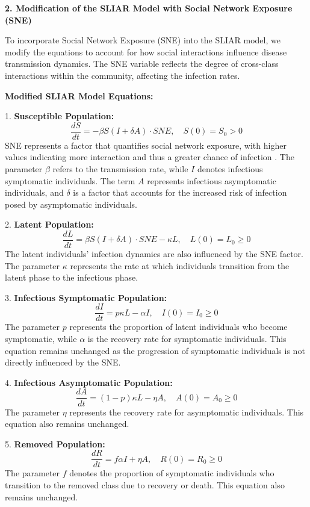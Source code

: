 \documentclass[9 pt]{article} %
\begin{document}
\textbf{2. Modification of the SLIAR Model with Social Network Exposure (SNE)}

To incorporate Social Network Exposure (SNE) into the SLIAR model, we modify the equations to account for how social interactions influence disease transmission dynamics. The SNE variable reflects the degree of cross-class interactions within the community, affecting the infection rates.

\textbf{Modified SLIAR Model Equations:}

1. \textbf{Susceptible Population:}
   \[
   \frac{dS}{dt} = -\beta S \left(I + \delta A\right) \cdot SNE, \quad S(0) = S_0 > 0
   \]
SNE represents a factor that quantifies social network exposure, with higher values indicating more interaction and thus a greater chance of infection \cite{nunner2021model}. The parameter \(\beta\) refers to the transmission rate, while \(I\) denotes infectious symptomatic individuals. The term \(A\) represents infectious asymptomatic individuals, and \(\delta\) is a factor that accounts for the increased risk of infection posed by asymptomatic individuals.

2. \textbf{Latent Population:}
   \[
   \frac{dL}{dt} = \beta S \left(I + \delta A\right) \cdot SNE - \kappa L, \quad L(0) = L_0 \geq 0
   \]
The latent individuals' infection dynamics are also influenced by the SNE factor. The parameter \(\kappa\) represents the rate at which individuals transition from the latent phase to the infectious phase.

3. \textbf{Infectious Symptomatic Population:}
   \[
   \frac{dI}{dt} = p \kappa L - \alpha I, \quad I(0) = I_0 \geq 0
   \]
The parameter \(p\) represents the proportion of latent individuals who become symptomatic, while \(\alpha\) is the recovery rate for symptomatic individuals. This equation remains unchanged as the progression of symptomatic individuals is not directly influenced by the SNE.

4. \textbf{Infectious Asymptomatic Population:}
   \[
   \frac{dA}{dt} = (1 - p) \kappa L - \eta A, \quad A(0) = A_0 \geq 0
   \]
The parameter \(\eta\) represents the recovery rate for asymptomatic individuals. This equation also remains unchanged.

5. \textbf{Removed Population:}
   \[
   \frac{dR}{dt} = f \alpha I + \eta A, \quad R(0) = R_0 \geq 0
   \]
The parameter \(f\) denotes the proportion of symptomatic individuals who transition to the removed class due to recovery or death. This equation also remains unchanged.
\end{document}
